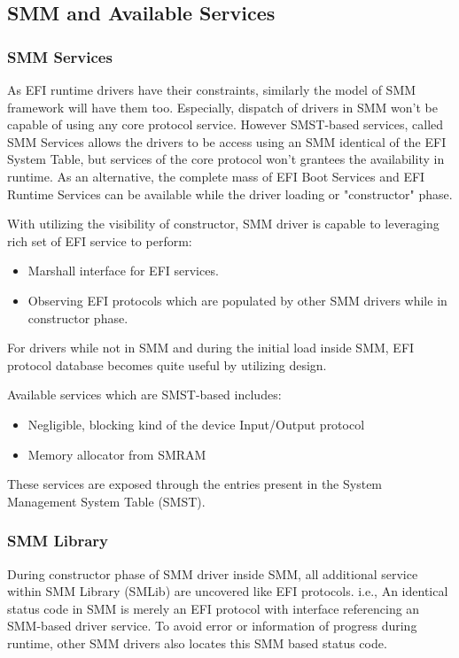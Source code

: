 \subsection{SMM and Available Services}\label{subsection-smm-available-services}

\subsubsection{SMM Services}\label{subsection-smm-services}
As EFI runtime drivers have their constraints, similarly the model of SMM  framework will have them too. Especially, dispatch of drivers in SMM won't be capable of using any core protocol service. However SMST-based services, called SMM Services allows the drivers to be access using an SMM identical of the EFI System Table, but services of the core protocol won't grantees the availability in runtime. As an alternative, the complete mass of EFI Boot Services and EFI Runtime Services can be available while the driver loading or "constructor" phase. 

With utilizing the visibility of constructor, SMM driver is capable to leveraging rich set of EFI service to perform:
\begin{itemize}
	\item Marshall interface for EFI services.
	\item Observing EFI protocols which are populated by other SMM drivers while in constructor phase.
\end{itemize}

For drivers while not in SMM and during the initial load inside SMM, EFI protocol database becomes quite useful by utilizing design.

Available services which are SMST-based includes:
\begin{itemize}
	\item Negligible, blocking kind of the device Input/Output protocol
	\item Memory allocator from SMRAM
\end{itemize}
These services are exposed through the entries present in the System Management System Table (SMST).

\subsubsection{SMM Library}\label{subsection-smm-lib}
During constructor phase of SMM driver inside SMM, all additional service within SMM Library (SMLib) are uncovered like EFI protocols. i.e., An identical status code in SMM is merely an EFI protocol with interface referencing an SMM-based driver service. To avoid error or information of progress during runtime, other SMM drivers also locates this SMM based status code.

